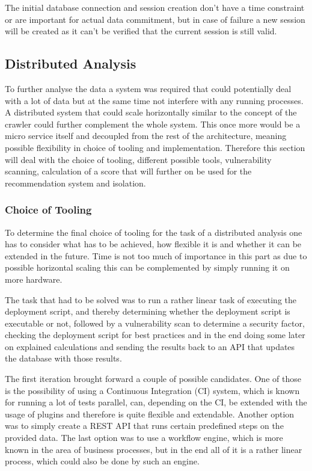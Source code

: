 The initial database connection and session creation don't have a time constraint or are important for actual data commitment, but in case of failure a new session will be created as it can't be verified that the current session is still valid.

\subsection{Distributed Analysis}
To further analyse the data a system was required that could potentially deal with a lot of data but at the same time not interfere with any running processes. A distributed system that could scale horizontally similar to the concept of the crawler could further complement the whole system. This once more would be a micro service itself and decoupled from the rest of the architecture, meaning possible flexibility in choice of tooling and implementation. Therefore this section will deal with the choice of tooling, different possible tools, vulnerability scanning, calculation of a score that will further on be used for the recommendation system and isolation.

\subsubsection{Choice of Tooling}
To determine the final choice of tooling for the task of a distributed analysis one has to consider what has to be achieved, how flexible it is and whether it can be extended in the future. Time is not too much of importance in this part as due to possible horizontal scaling this can be complemented by simply running it on more hardware.

The task that had to be solved was to run a rather linear task of executing the deployment script, and thereby determining whether the deployment script is executable or not, followed by a vulnerability scan to determine a security factor, checking the deployment script for best practices and in the end doing some later on explained calculations and sending the results back to an API that updates the database with those results.

The first iteration brought forward a couple of possible candidates. One of those is the possibility of using a Continuous Integration (CI) system, which is known for running a lot of tests parallel, can, depending on the CI, be extended with the usage of plugins and therefore is quite flexible and extendable. Another option was to simply create a REST API that runs certain predefined steps on the provided data. The last option was to use a workflow engine, which is more known in the area of business processes, but in the end all of it is a rather linear process, which could also be done by such an engine.

